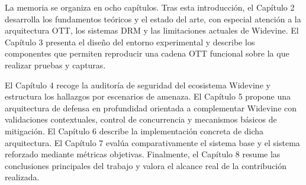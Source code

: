 La memoria se organiza en ocho capítulos. Tras esta introducción, el Capítulo 2 desarrolla los fundamentos teóricos y el estado del arte, con especial atención a la arquitectura OTT, los sistemas DRM y las limitaciones actuales de Widevine. El Capítulo 3 presenta el diseño del entorno experimental y describe los componentes que permiten reproducir una cadena OTT funcional sobre la que realizar pruebas y capturas.

El Capítulo 4 recoge la auditoría de seguridad del ecosistema Widevine y estructura los hallazgos por escenarios de amenaza. El Capítulo 5 propone una arquitectura de defensa en profundidad orientada a complementar Widevine con validaciones contextuales, control de concurrencia y mecanismos básicos de mitigación. El Capítulo 6 describe la implementación concreta de dicha arquitectura. El Capítulo 7 evalúa comparativamente el sistema base y el sistema reforzado mediante métricas objetivas. Finalmente, el Capítulo 8 resume las conclusiones principales del trabajo y valora el alcance real de la contribución realizada.
